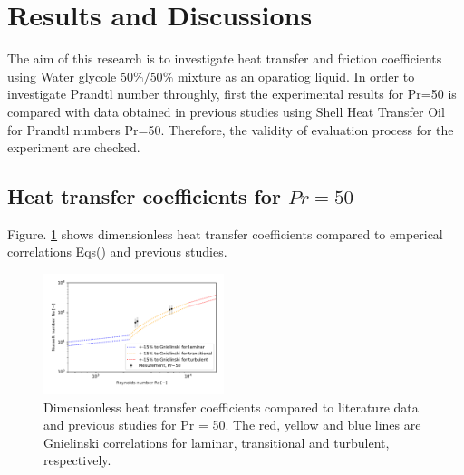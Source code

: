 \documentclass[conference]{IEEEtran}
\begin{document}
\section{Results and Discussions}
The aim of this research is to investigate heat transfer and friction coefficients using  Water glycole $50\%/50\%$ mixture as an oparatiog liquid.
In order to investigate Prandtl number throughly, first the experimental results for Pr=50 is compared with data obtained in previous studies \cite{Christphan2018} using Shell Heat Transfer Oil for Prandtl numbers Pr=50.
Therefore, the validity of evaluation process for the experiment are checked.


\subsection{Heat transfer coefficients for $Pr=50$}
Figure. \ref{renu_pr50} shows dimensionless heat transfer coefficients compared to emperical correlations Eqs() and previous studies.
\begin{figure}[htbp]
  \centering
  \vspace{5zh}
  \includegraphics[width=0.47\textwidth,natwidth=400,natheight=200]{fig/renu_pr50.pdf}
  \vspace{-1.5zh}
  \caption{Dimensionless heat transfer coefficients compared to literature data and previous studies for Pr = 50. The red, yellow and blue lines are Gnielinski correlations for laminar, transitional and turbulent, respectively.}
  \label{renu_pr50}
\end{figure}
\end{document}
